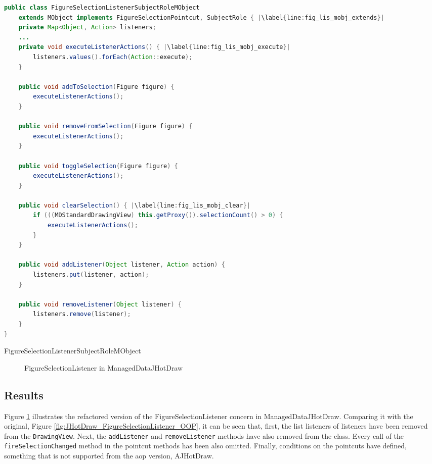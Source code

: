 \begin{sourcecode} [H]
	\begin{lstlisting}[language=Java, escapechar=|]
public class FigureSelectionListenerSubjectRoleMObject 
	extends MObject implements FigureSelectionPointcut, SubjectRole { |\label{line:fig_lis_mobj_extends}|
	private Map<Object, Action> listeners;
	...
	private void executeListenerActions() { |\label{line:fig_lis_mobj_execute}|
		listeners.values().forEach(Action::execute);
	}

	public void addToSelection(Figure figure) {
		executeListenerActions();
	}

	public void removeFromSelection(Figure figure) {
		executeListenerActions();
	}

	public void toggleSelection(Figure figure) {
		executeListenerActions();
	}

	public void clearSelection() { |\label{line:fig_lis_mobj_clear}|
		if (((MDStandardDrawingView) this.getProxy()).selectionCount() > 0) {
			executeListenerActions();
		}
	}

	public void addListener(Object listener, Action action) {
		listeners.put(listener, action);
	}

	public void removeListener(Object listener) {
		listeners.remove(listener);
	}
}
	\end{lstlisting}
	\caption{FigureSelectionListenerSubjectRoleMObject}
	\label{lst:FigureSelectionListenerSubjectRoleMObject}
\end{sourcecode}

\begin{figure}
	\centering
  	\caption{FigureSelectionListener in ManagedDataJHotDraw}
  	\label{fig:JHotDraw_FigureSelectionListener_MD}
\end{figure}

\subsection{Results}
Figure \ref{fig:JHotDraw_FigureSelectionListener_MD} illustrates the refactored version of the FigureSelectionListener concern in ManagedDataJHotDraw.
Comparing it with the original, Figure \ref{fig:JHotDraw_FigureSelectionListener_OOP}, it can be seen that, first, the list listeners of listeners have been removed from the \texttt{DrawingView}. 
Next, the \texttt{addListener} and \texttt{removeListener} methods have also removed from the class.
Every call of the \texttt{fireSelectionChanged} method in the pointcut methods has been also omitted.
Finally, conditions on the pointcuts have defined, something that is not supported from the \ac{aop} version, AJHotDraw.


